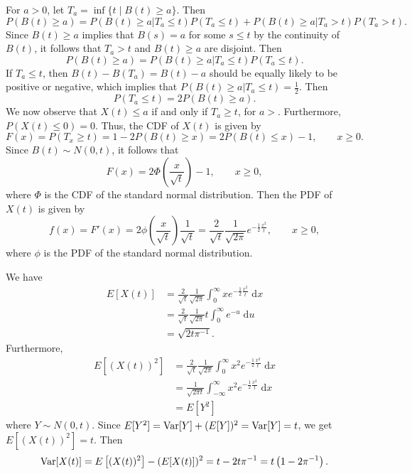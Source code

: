 \documentclass{homework}
\begin{document}
	\question 
	\begin{alphaparts}
		\questionpart For $a > 0$, let $T_a = \inf\{t \mid B(t) \ge a\}$. Then
		\begin{equation*}
			P(B(t) \ge a) = P(B(t)\ge a|T_a\le t)P(T_a\le t) + P(B(t) \ge a|T_a>t)P(T_a>t).
		\end{equation*}
		Since $B(t)\ge a$ implies that $B(s) = a$ for some $s \le t$ by the continuity of $B(t)$, it follows that $T_a > t$ and $B(t) \ge a$ are disjoint. Then
		\begin{equation*}
			P(B(t)\ge a) = P(B(t)\ge a|T_a\le t)P(T_a\le t).
		\end{equation*}
		If $T_a \le t$, then $B(t) - B(T_a) = B(t) - a$ should be equally likely to be positive or negative, which implies that $P(B(t) \ge a|T_a\le t) = \frac{1}{2}$. Then
		\begin{equation*}
			P(T_a \le t) = 2P(B(t)\ge a).
		\end{equation*}
		We now observe that $X(t) \le a$ if and only if $T_a \ge t$, for $a > $. Furthermore, $P(X(t) \le 0) = 0$. Thus, the CDF of $X(t)$ is given by
		\begin{equation*}
			F(x) = P(T_x \ge t) = 1 - 2P(B(t)\ge x) = 2P(B(t)\le x) - 1, \qquad x \ge 0.
		\end{equation*}
		Since $B(t) \sim N(0,t)$, it follows that
		\begin{equation*}
			F(x) = 2\Phi\left(\frac{x}{\sqrt{t}}\right) - 1, \qquad x \ge 0,
		\end{equation*}
		where $\Phi$ is the CDF of the standard normal distribution. Then the PDF of $X(t)$ is given by
		\begin{equation*}
			f(x) = F'(x) = 2\phi\left(\frac{x}{\sqrt{t}}\right)\frac{1}{\sqrt{t}} = \frac{2}{\sqrt{t}}\frac{1}{\sqrt{2\pi}}e^{-\frac{1}{2}\frac{x^2}{t}}, \qquad x \ge 0,
		\end{equation*}
		where $\phi$ is the PDF of the standard normal distribution.
		
		\questionpart We have
		\begin{align*}
			 E[X(t)] &= \frac{2}{\sqrt{t}}\frac{1}{\sqrt{2\pi}}\int_{0}^\infty x e^{-\frac{1}{2}\frac{x^2}{t}}\;\text{d}x \\
			 &= \frac{2}{\sqrt{t}}\frac{1}{\sqrt{2\pi}} t\int_0^\infty e^{-u}\;\text{d}u \\
			 &= \sqrt{2t\pi^{-1}}.
		\end{align*}
		Furthermore,
		\begin{align*}
			E\left[(X(t))^2\right] &= \frac{2}{\sqrt{t}}\frac{1}{\sqrt{2\pi}}\int_0^\infty x^2e^{-\frac{1}{2}\frac{x^2}{t}}\;\text{d}x \\
			&= \frac{1}{\sqrt{2\pi t}}\int_{-\infty}^\infty x^2e^{-\frac{1}{2}\frac{x^2}{t}}\;\text{d}x \\
			&= E[Y^2]
		\end{align*}
		where $Y \sim N(0, t)$. Since $E[Y^2] = \mathrm{Var}[Y] + (E[Y])^2 = \mathrm{Var}[Y] = t$, we get $E\left[(X(t))^2\right] = t$. Then
		\begin{equation*}
			\mathrm{Var}[X(t)] = E\left[(X(t))^2\right] - (E[X(t)])^2 = t - 2t\pi^{-1} = t\left(1-2\pi^{-1}\right).
		\end{equation*}
	\end{alphaparts}
	
\end{document}
